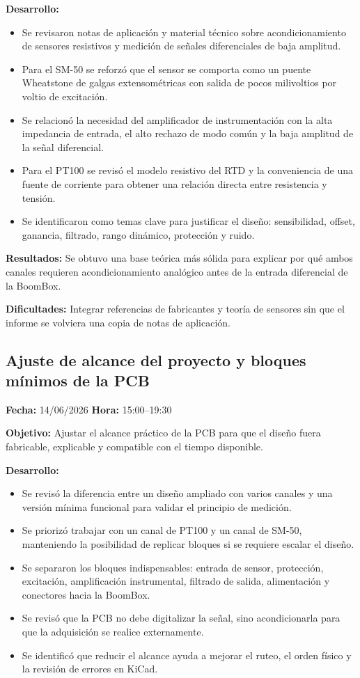 \documentclass[12pt]{article}
\begin{document}
\textbf{Desarrollo:}
\begin{itemize}
\item Se revisaron notas de aplicación y material técnico sobre acondicionamiento de sensores resistivos y medición de señales diferenciales de baja amplitud.
\item Para el SM-50 se reforzó que el sensor se comporta como un puente Wheatstone de galgas extensométricas con salida de pocos milivoltios por voltio de excitación.
\item Se relacionó la necesidad del amplificador de instrumentación con la alta impedancia de entrada, el alto rechazo de modo común y la baja amplitud de la señal diferencial.
\item Para el PT100 se revisó el modelo resistivo del RTD y la conveniencia de una fuente de corriente para obtener una relación directa entre resistencia y tensión.
\item Se identificaron como temas clave para justificar el diseño: sensibilidad, offset, ganancia, filtrado, rango dinámico, protección y ruido.
\end{itemize}

\textbf{Resultados:}
Se obtuvo una base teórica más sólida para explicar por qué ambos canales requieren acondicionamiento analógico antes de la entrada diferencial de la BoomBox.

\textbf{Dificultades:}
Integrar referencias de fabricantes y teoría de sensores sin que el informe se volviera una copia de notas de aplicación.

\subsection{Ajuste de alcance del proyecto y bloques mínimos de la PCB}
\textbf{Fecha:} 14/06/2026 \quad \textbf{Hora:} 15:00--19:30

\textbf{Objetivo:}
Ajustar el alcance práctico de la PCB para que el diseño fuera fabricable, explicable y compatible con el tiempo disponible.

\textbf{Desarrollo:}
\begin{itemize}
\item Se revisó la diferencia entre un diseño ampliado con varios canales y una versión mínima funcional para validar el principio de medición.
\item Se priorizó trabajar con un canal de PT100 y un canal de SM-50, manteniendo la posibilidad de replicar bloques si se requiere escalar el diseño.
\item Se separaron los bloques indispensables: entrada de sensor, protección, excitación, amplificación instrumental, filtrado de salida, alimentación y conectores hacia la BoomBox.
\item Se revisó que la PCB no debe digitalizar la señal, sino acondicionarla para que la adquisición se realice externamente.
\item Se identificó que reducir el alcance ayuda a mejorar el ruteo, el orden físico y la revisión de errores en KiCad.
\end{itemize}
\end{document}
